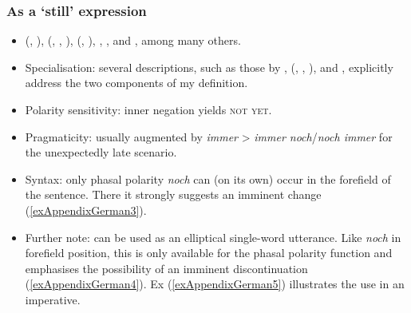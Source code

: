 \subsubsection{As a \lq{}still\rq{ }expression}
\label{appendixGermanStill}
\begin{itemize}
	\item \citeauthor{Abraham1977} (\citeyear{Abraham1977}, \citeyear{Abraham1980}), \citeauthor{vanderAuwera1991BeyondDuality} (\citeyear{vanderAuwera1991BeyondDuality}, \citeyear{vanderAuwera1993}, \citeyear{vanderAuwera1998}),  \citeauthor{Beck2016} (\citeyear{Beck2016}, \citeyear{Beck2019} \citeyear{Beck2020}), \textcite{Doherty1973}, \textcite[185–187]{Helbig1994}, \textcite{HoepelmanRohrer1981} and \textcite{Loebner1989}, among many others.
	
\item Specialisation: several descriptions, such as those by \textcite{Abraham1977}, \citeauthor{Beck2016} (\citeyear{Beck2016}, \citeyear{Beck2019}, \citeyear{Beck2020}), \textcite{Doherty1973} and \textcite{Klein2018}, explicitly address the two components of my definition.
\item Polarity sensitivity: inner negation yields \textsc{not yet}.
\item Pragmaticity: usually  augmented by \textit{immer} > \textit{immer noch}/\textit{noch immer} for the unexpectedly late scenario.
\item Syntax: only phasal polarity \textit{noch} can (on its own) occur in the forefield of the sentence. There it strongly suggests an imminent change (\ref{exAppendixGerman3}).
\item Further note: can be used as an elliptical single-word utterance. Like \textit{noch} in forefield position, this is only available for the phasal polarity function and emphasises the possibility of an imminent discontinuation (\ref{exAppendixGerman4}). Ex (\ref{exAppendixGerman5}) illustrates the use in an imperative.
\end{itemize}
